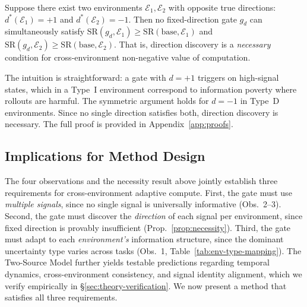 \begin{proposition}
\label{prop:necessity}
Suppose there exist two environments $\mathcal{E}_1, \mathcal{E}_2$
with opposite true directions: $d^*(\mathcal{E}_1) = +1$ and
$d^*(\mathcal{E}_2) = -1$. Then no fixed-direction gate $g_d$ can
simultaneously satisfy
$\mathrm{SR}(g_d, \mathcal{E}_1) \geq \mathrm{SR}(\mathrm{base},
\mathcal{E}_1)$ and
$\mathrm{SR}(g_d, \mathcal{E}_2) \geq \mathrm{SR}(\mathrm{base},
\mathcal{E}_2)$.
That is, direction discovery is a \emph{necessary} condition for
cross-environment non-negative value of computation.
\end{proposition}

The intuition is straightforward: a gate with $d = +1$ triggers on
high-signal states, which in a Type~I environment correspond to
information poverty where rollouts are harmful. The symmetric
argument holds for $d = -1$ in Type~D environments. Since no single
direction satisfies both, direction discovery is necessary. The full
proof is provided in Appendix~\ref{app:proofs}.

\subsection{Implications for Method Design}
\label{sec:implications}

The four observations and the necessity result above jointly
establish three requirements for cross-environment adaptive compute.
First, the gate must use \emph{multiple signals}, since no single
signal is universally informative (Obs.~2--3). Second, the gate must
discover the \emph{direction} of each signal per environment, since
fixed direction is provably insufficient
(Prop.~\ref{prop:necessity}). Third, the gate must adapt to each
\emph{environment's} information structure, since the dominant
uncertainty type varies across tasks
(Obs.~1, Table~\ref{tab:env-type-mapping}). The Two-Source Model
further yields testable predictions regarding temporal dynamics,
cross-environment consistency, and signal identity alignment, which
we verify empirically in \S\ref{sec:theory-verification}. We now
present a method that satisfies all three requirements.
